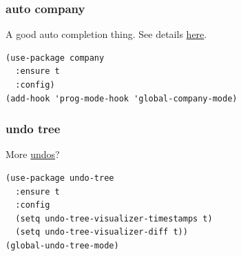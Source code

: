 \documentclass[11pt]{article}
\begin{document}
\subsubsection{auto company}
\label{sec:orgda647f0}

A good auto completion thing. See details \href{https://company-mode.github.io/}{here}.

\begin{verbatim}
(use-package company
  :ensure t
  :config)
(add-hook 'prog-mode-hook 'global-company-mode)
\end{verbatim}
\subsubsection{undo tree}
\label{sec:orge65322a}

More \href{https://elpa.gnu.org/packages/undo-tree.html}{undos}?

\begin{verbatim}
(use-package undo-tree
  :ensure t
  :config
  (setq undo-tree-visualizer-timestamps t)
  (setq undo-tree-visualizer-diff t))
(global-undo-tree-mode)
\end{verbatim}
\end{document}
